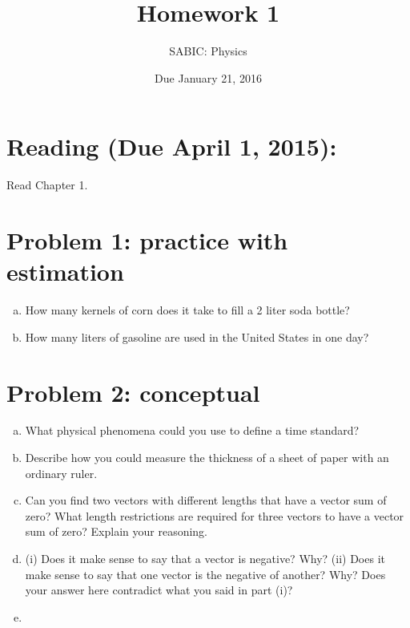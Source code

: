 \documentclass[10pt,letter]{article}
\begin{document}


\title{Homework 1}

\author{SABIC: Physics}

\date{Due January 21, 2016}
 
\maketitle 

\section*{Reading (Due April 1, 2015):}
Read Chapter 1.
\section*{Problem 1: practice with estimation}
\begin{enumerate}[(a)]
\item How many kernels of corn does it take to fill a 2 liter soda bottle?
\item How many liters of gasoline are used in the United States in one day? 
\end{enumerate}
\section*{Problem 2: conceptual}
\begin{enumerate}[(a)]
\item What physical phenomena could you use to define a time standard?
\item Describe how you could measure the thickness of a sheet of
paper with an ordinary ruler.
\item Can you find two vectors with different lengths that have a
vector sum of zero? What length restrictions are required for three
vectors to have a vector sum of zero? Explain your reasoning.
\item(i) Does it make sense to say that a vector is negative?
Why? (ii) Does it make sense to say that one vector is the negative
of another? Why? Does your answer here contradict what you said
in part (i)?
\item 
\end{enumerate}
\end{document}
